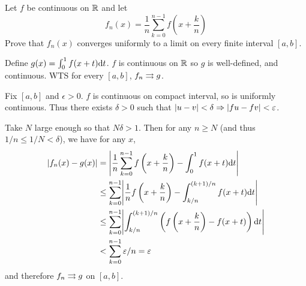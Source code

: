 \documentclass[a4paper, 12pt]{article}
\begin{document}
\begin{problem} 
Let $f$ be continuous on $\mathbb{R}$ and let \begin{equation*}
f_n(x) = \frac{1}{n} \sum_{k=0}^{n-1}f\left(x + \frac{k}{n}\right)
\end{equation*}
Prove that $f_n(x)$ converges uniformly to a limit on every finite interval $[a, b]$.
\end{problem}
\begin{solution}
    Define $g(x) = \int_{0}^{1} f(x + t) \mathrm{d} t$. $f$ is continuous on $\mathbb{R}$ so $g$ is well-defined, and continuous. WTS for every $[a, b]$, $f_n \rightrightarrows g$.

    Fix $[a, b]$ and $\epsilon > 0$. $f$ is continuous on compact interval, so is uniformly continuous. Thus there exists $\delta > 0$ such that $\lvert u - v\rvert < \delta \Rightarrow \lvert fu - fv\rvert < \varepsilon$.

    Take $N$ large enough so that $N \delta > 1$. Then for any $n \geq N$ (and thus $1/ n \leq 1/N < \delta$), we have for any $x$, \begin{align*}
    \abs{f_n(x) - g(x)} &= \abs*{\frac{1}{n} \sum_{k=0}^{n-1}f\left(x + \frac{k}{n}\right) - \int_{0}^{1} f(x + t) \dt} \\
    &\leq \sum_{k=0}^{n-1} \abs*{\frac{1}{n} f\left( x + \frac{k}{n} \right) - \int_{k/n}^{(k+1)/n} f(x + t) \dt } \\
    & \leq \sum_{k=0}^{n-1}  \abs*{\int_{k/n}^{(k+1)/n} \left(f\left( x + \frac{k}{n} \right) - f(x + t) \right) \dt} \\
    &< \sum_{k=0}^{n-1} \epsilon/n = \epsilon
    \end{align*}
    and therefore $f_n \rightrightarrows g$ on $[a, b]$.
\end{solution}
\end{document}
